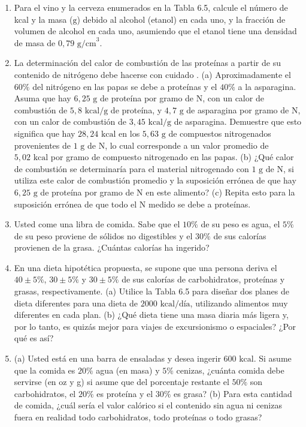 \documentclass[12pt]{book}
\begin{document}
\begin{enumerate}
\item[6.25] Para el vino y la cerveza enumerados en la Tabla 6.5, calcule el número de kcal y la masa ($\text{g}$) debido al alcohol (etanol) en cada uno, y la fracción de volumen de alcohol en cada uno, asumiendo que el etanol tiene una densidad de masa de $0{,}79\text{ g/cm}^3$.

\item[6.26] La determinación del calor de combustión de las proteínas a partir de su contenido de nitrógeno debe hacerse con cuidado \cite{68}. (a) Aproximadamente el $60\%$ del nitrógeno en las papas se debe a proteínas y el $40\%$ a la asparagina. Asuma que hay $6{,}25\text{ g}$ de proteína por gramo de N, con un calor de combustión de $5{,}8\text{ kcal/g}$ de proteína, y $4{,}7\text{ g}$ de asparagina por gramo de N, con un calor de combustión de $3{,}45\text{ kcal/g}$ de asparagina. Demuestre que esto significa que hay $28{,}24\text{ kcal}$ en los $5{,}63\text{ g}$ de compuestos nitrogenados provenientes de $1\text{ g}$ de N, lo cual corresponde a un valor promedio de $5{,}02\text{ kcal}$ por gramo de compuesto nitrogenado en las papas. (b) ¿Qué calor de combustión se determinaría para el material nitrogenado con $1\text{ g}$ de N, si utiliza este calor de combustión promedio y la suposición errónea de que hay $6{,}25\text{ g}$ de proteína por gramo de N en este alimento? (c) Repita esto para la suposición errónea de que todo el N medido se debe a proteínas.

\item[6.27] Usted come una libra de comida. Sabe que el $10\%$ de su peso es agua, el $5\%$ de su peso proviene de sólidos no digestibles y el $30\%$ de sus calorías provienen de la grasa. ¿Cuántas calorías ha ingerido?

\item[6.28] En una dieta hipotética propuesta, se supone que una persona deriva el $40 \pm 5\%$, $30 \pm 5\%$ y $30 \pm 5\%$ de sus calorías de carbohidratos, proteínas y grasas, respectivamente. (a) Utilice la Tabla 6.5 para diseñar dos planes de dieta diferentes para una dieta de $2000\text{ kcal/día}$, utilizando alimentos muy diferentes en cada plan. (b) ¿Qué dieta tiene una masa diaria más ligera y, por lo tanto, es quizás mejor para viajes de excursionismo o espaciales? ¿Por qué es así?

\item[6.29] (a) Usted está en una barra de ensaladas y desea ingerir $600\text{ kcal}$. Si asume que la comida es $20\%$ agua (en masa) y $5\%$ cenizas, ¿cuánta comida debe servirse (en oz y g) si asume que del porcentaje restante el $50\%$ son carbohidratos, el $20\%$ es proteína y el $30\%$ es grasa? (b) Para esta cantidad de comida, ¿cuál sería el valor calórico si el contenido sin agua ni cenizas fuera en realidad todo carbohidratos, todo proteínas o todo grasas?


\end{enumerate}
\end{document}
